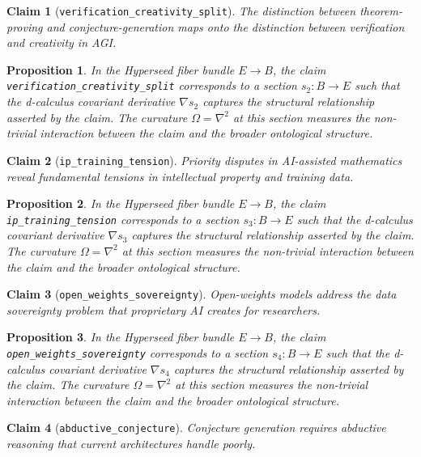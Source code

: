 \documentclass{article}
\newtheorem{claim}{Claim}
\newtheorem{proposition}{Proposition}
\begin{document}
\begin{claim}[\texttt{verification_creativity_split}]
The distinction between theorem-proving and conjecture-generation maps onto the distinction between verification and creativity in AGI.
\end{claim}

\begin{proposition}
In the Hyperseed fiber bundle $E \to B$, the claim \texttt{verification_creativity_split} corresponds to a section $s_2: B \to E$ such that the d-calculus covariant derivative $\nabla s_2$ captures the structural relationship asserted by the claim. The curvature $\Omega = \nabla^2$ at this section measures the non-trivial interaction between the claim and the broader ontological structure.
\end{proposition}

\begin{claim}[\texttt{ip_training_tension}]
Priority disputes in AI-assisted mathematics reveal fundamental tensions in intellectual property and training data.
\end{claim}

\begin{proposition}
In the Hyperseed fiber bundle $E \to B$, the claim \texttt{ip_training_tension} corresponds to a section $s_3: B \to E$ such that the d-calculus covariant derivative $\nabla s_3$ captures the structural relationship asserted by the claim. The curvature $\Omega = \nabla^2$ at this section measures the non-trivial interaction between the claim and the broader ontological structure.
\end{proposition}

\begin{claim}[\texttt{open_weights_sovereignty}]
Open-weights models address the data sovereignty problem that proprietary AI creates for researchers.
\end{claim}

\begin{proposition}
In the Hyperseed fiber bundle $E \to B$, the claim \texttt{open_weights_sovereignty} corresponds to a section $s_4: B \to E$ such that the d-calculus covariant derivative $\nabla s_4$ captures the structural relationship asserted by the claim. The curvature $\Omega = \nabla^2$ at this section measures the non-trivial interaction between the claim and the broader ontological structure.
\end{proposition}

\begin{claim}[\texttt{abductive_conjecture}]
Conjecture generation requires abductive reasoning that current architectures handle poorly.
\end{claim}
\end{document}
